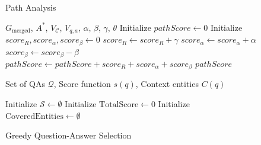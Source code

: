 \documentclass[11pt]{article}
\begin{document}
\begin{figure}[ht]
    \centering
    \begin{minipage}{.5\textwidth}
        \centering
        \begin{algorithm}[H]
            \caption{Path Analysis}
            \label{alg:refined_graph_path_analysis}
            \begin{algorithmic}[1]
                \REQUIRE $G_{\text{merged}}$, $A^*$, $V_{\mathcal{C}}$, $V_{q,a}$, $\alpha$, $\beta$, $\gamma$, $\theta$
                    \STATE Initialize $pathScore \leftarrow 0$
                                \STATE Initialize $score_R, score_{\alpha}, score_{\beta} \leftarrow 0$
                                    \STATE $score_R \leftarrow score_R + \gamma$
                                \ENDIF
                                        \STATE $score_{\alpha} \leftarrow score_{\alpha} + \alpha$
                                    \ENDIF
                                        \STATE $score_{\beta} \leftarrow score_{\beta} - \beta$
                                    \ENDIF
                                \ENDFOR
                                \STATE $pathScore \leftarrow pathScore + score_R + score_{\alpha} + score_{\beta}$
                            \ENDFOR
                        \ENDIF
                    \ENDFOR
                \ENDFOR
                \RETURN $pathScore$
                \vspace{1.38cm}
            \end{algorithmic}
        \end{algorithm}
    \end{minipage}%
    \begin{minipage}{.5\textwidth}
        \centering
        \begin{algorithm}[H]
            \caption{Greedy Question-Answer Selection}
            \label{alg:greedy_qa_selection}
            \begin{algorithmic}[1]
                \REQUIRE Set of QAs $\mathcal{Q}$, Score function $s(q)$, Context entities $C(q)$

                \STATE Initialize $\mathcal{S} \gets \emptyset$
                \STATE Initialize $\text{TotalScore} \gets 0$
                \STATE Initialize $\text{CoveredEntities} \gets \emptyset$
                

\end{algorithmic}
\end{algorithm}
\end{minipage}
\end{figure}
\end{document}
